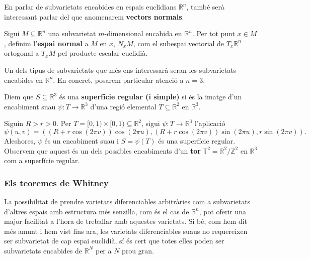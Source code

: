 En parlar de subvarietats encabides en espais euclidians $\mathbb R^n$, també serà interessant parlar del que anomenarem \textbf{vectors normals}.
\begin{defi}\label{def:espai_normal}
    Sigui $M\subseteq\mathbb R^n$ una subvarietat $m$-dimensional encabida en $\mathbb R^n$. Per tot punt $x\in M$, definim l'\textbf{espai normal} a $M$ en $x$, $N_xM$, com el subespai vectorial de $T_x\mathbb R^n$ ortogonal a $T_xM$ pel producte escalar euclidià.
\end{defi}

Un dels tipus de subvarietats que més ens interessarà seran les subvarietats encabides en $\mathbb R^n$. En concret, posarem particular atenció a $n=3$.

\begin{defi}
    Diem que $S\subseteq\mathbb R^3$ és una \textbf{superfície regular (i simple)} si és la imatge d'un encabiment suau $\psi:T\to\mathbb R^3$ d'una regió elemental $T\subseteq\mathbb R^2$ en $\mathbb R^3$.
\end{defi}

\begin{ex}\label{ex:tor}
    Siguin $R>r>0$. Per $T = [0,1)\times[0,1)\subseteq\mathbb R^2$, sigui $\psi:T\to\mathbb R^3$ l'aplicació
    \begin{equation*}
        \psi(u,v) = \left( (R+r\cos(2\pi v))\cos(2\pi u), (R+r\cos(2\pi v))\sin(2\pi u), r\sin(2\pi v) \right).
    \end{equation*}
    Aleshores, $\psi$ és un encabiment suau i $S = \psi(T)$ és una superfície regular. Observem que aquest és un dels possibles encabiments d'un \textbf{tor} $\mathbb T^2 = \mathbb R^2/\mathbb Z^2$ en $\mathbb R^3$ com a superfície regular.
\end{ex}

\subsubsection{Els teoremes de Whitney}
La possibilitat de prendre varietats diferenciables arbitràries com a subvarietats d'altres espais amb estructura més senzilla, com és el cas de $\mathbb R^n$, pot oferir una major facilitat a l'hora de treballar amb aquestes varietats. Si bé, com hem dit més amunt i hem vist fins ara, les varietats diferenciables suaus no requereixen ser subvarietat de cap espai euclidià, sí és cert que totes elles poden ser subvarietats encabides de $\mathbb R^N$ per a $N$ prou gran.

